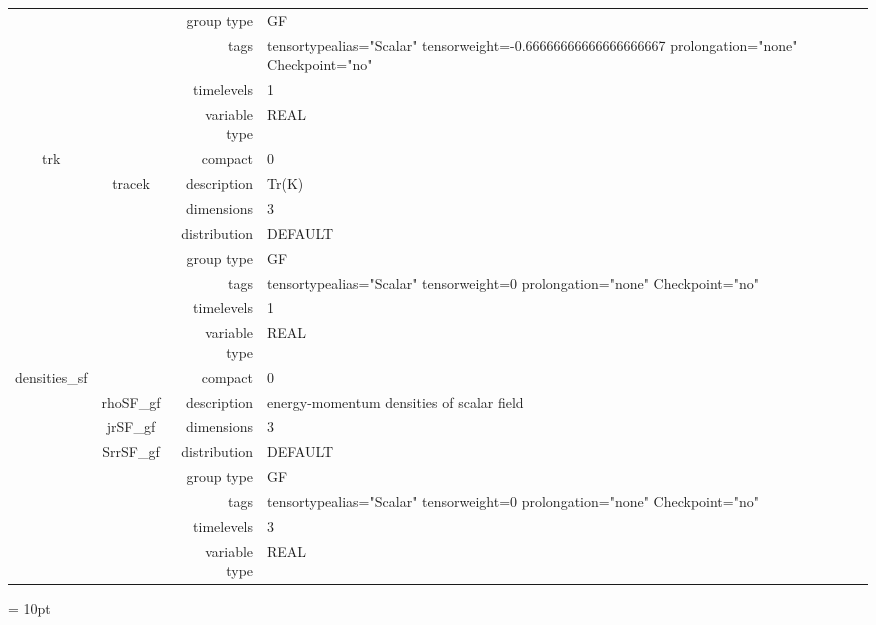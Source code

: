 \begin{tabular*}{150mm}{|c|c@{\extracolsep{\fill}}|rl|}
 &  & group type & GF \\ 
 &  & tags & tensortypealias="Scalar" tensorweight=-0.66666666666666666667 prolongation="none" Checkpoint="no" \\ 
 &  & timelevels & 1 \\ 
 &  & variable type & REAL \\ 
\hline 
trk &  & compact & 0 \\ 
 & tracek & description & Tr(K) \\ 
 &  & dimensions & 3 \\ 
 &  & distribution & DEFAULT \\ 
 &  & group type & GF \\ 
 &  & tags & tensortypealias="Scalar" tensorweight=0 prolongation="none" Checkpoint="no" \\ 
 &  & timelevels & 1 \\ 
 &  & variable type & REAL \\ 
\hline 
densities\_sf &  & compact & 0 \\ 
 & rhoSF\_gf & description & energy-momentum densities of scalar field \\ 
 & jrSF\_gf & dimensions & 3 \\ 
 & SrrSF\_gf & distribution & DEFAULT \\ 
 &  & group type & GF \\ 
 &  & tags & tensortypealias="Scalar" tensorweight=0 prolongation="none" Checkpoint="no" \\ 
 &  & timelevels & 3 \\ 
 &  & variable type & REAL \\ 
\hline 
\end{tabular*} 



\vspace{5mm}\parskip = 10pt 

